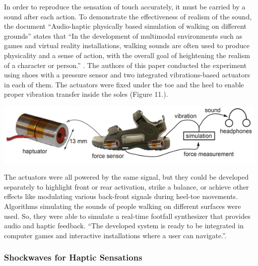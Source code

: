 \documentclass[12pt, a4paper]{article}
\begin{document}
\begin{multicols}{2}
In order to reproduce the sensation of touch accurately, it must be carried by a sound after each action. To demonstrate the effectiveness of realism of the sound, the document “Audio-haptic physically based simulation of walking on different grounds” states that “In the development of multimodal environments such as games and virtual reality installations, walking sounds are often used to produce physicality and a sense of action, with the overall goal of heightening the realism of a character or person.” \cite{soundAndHapic}. The authors of this paper conducted the experiment using shoes with a pressure sensor and two integrated vibrations-based actuators in each of them. The actuators were fixed under the toe and the heel to enable proper vibration transfer inside the soles (Figure 11.).

\vspace*{3mm}
\captionsetup{type=figure}
\includegraphics[width=.49\textwidth]{System_hapic_and_sound_experiment.png}
\vspace*{3mm}

The actuators were all powered by the same signal, but they could be developed separately to highlight front or rear activation, strike a balance, or achieve other effects like modulating various back-front signals during heel-toe movements. Algorithms simulating the sounds of people walking on different surfaces were used. So, they were able to simulate a real-time footfall synthesizer that provides audio and haptic feedback. “The developed system is ready to be integrated in computer games and interactive installations where a user can navigate.”\cite{soundAndHapic}.

\subsubsection{Shockwaves for Haptic Sensations}


\end{multicols}
\end{document}
